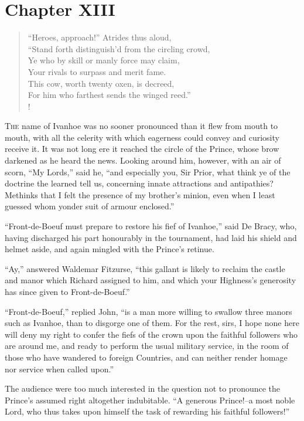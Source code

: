 \chapter{Chapter XIII}

\begin{verse}
``Heroes, approach!'' Atrides thus aloud,\\
``Stand forth distinguish'd from the circling crowd,\\
Ye who by skill or manly force may claim,\\
Your rivals to surpass and merit fame.\\
This cow, worth twenty oxen, is decreed,\\
For him who farthest sends the winged reed.''\\!
\end{verse}

\lettrine{T}{he} name of Ivanhoe was no sooner pronounced than it flew
from mouth to
mouth, with all the celerity with which eagerness could convey and
curiosity receive it. It was not long ere it reached the circle of the
Prince, whose brow darkened as he heard the news. Looking around him,
however, with an air of scorn, ``My Lords,'' said he, ``and especially
you, Sir Prior, what think ye of the doctrine the learned tell us,
concerning innate attractions and antipathies? Methinks that I felt the
presence of my brother's minion, even when I least guessed whom yonder
suit of armour enclosed.''

``Front-de-Boeuf must prepare to restore his fief of Ivanhoe,'' said De
Bracy, who, having discharged his part honourably in the tournament, had
laid his shield and helmet aside, and again mingled with the Prince's
retinue.

``Ay,'' answered Waldemar Fitzurse, ``this gallant is likely to reclaim
the castle and manor which Richard assigned to him, and which your
Highness's generosity has since given to Front-de-Boeuf.''

``Front-de-Boeuf,'' replied John, ``is a man more willing to swallow
three manors such as Ivanhoe, than to disgorge one of them. For the
rest, sirs, I hope none here will deny my right to confer the fiefs of
the crown upon the faithful followers who are around me, and ready to
perform the usual military service, in the room of those who have
wandered to foreign Countries, and can neither render homage nor service
when called upon.''

The audience were too much interested in the question not to pronounce
the Prince's assumed right altogether indubitable. ``A generous
Prince!--a most noble Lord, who thus takes upon himself the task of
rewarding his faithful followers!''

